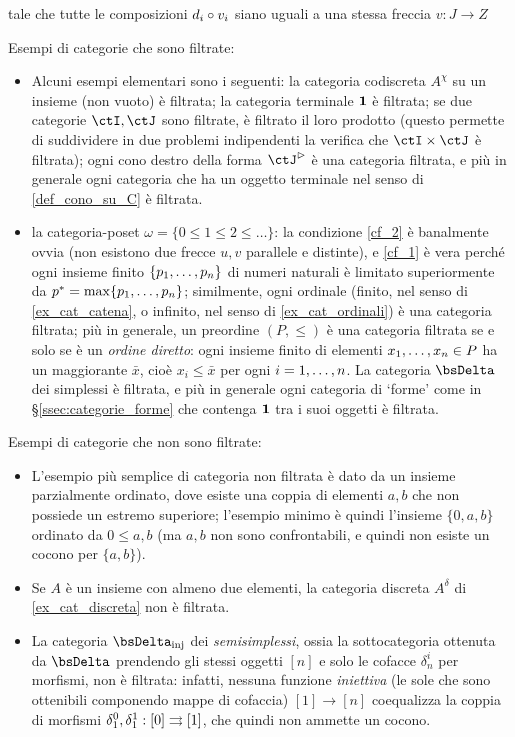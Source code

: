 tale che tutte le composizioni \(d_i\circ v_i\) siano uguali a una stessa freccia \(v : J\to Z\)
\begin{examples}\label{contro_esempi_filt}
	Esempi di categorie che sono filtrate:
	\begin{itemize}
		\item Alcuni esempi elementari sono i seguenti: la categoria codiscreta \(A^\chi\) su un insieme (non vuoto) è filtrata; la categoria terminale \(\mathbf{1}\) è filtrata; se due categorie \(\ctI,\ctJ\) sono filtrate, è filtrato il loro prodotto (questo permette di suddividere in due problemi indipendenti la verifica che \(\ctI\times\ctJ\) è filtrata); ogni cono destro della forma \(\ctJ^\rhd\) è una categoria filtrata, e più in generale ogni categoria che ha un oggetto terminale nel senso di \ref{def_cono_su_C} è filtrata.
		\item la categoria-poset \(\omega=\{0\le 1\le 2\le\dots\}\): la condizione \ref{cf_2} è banalmente ovvia (non esistono due frecce \(u,v\) parallele e distinte), e \ref{cf_1} è vera perché ogni insieme finito \(\{\tup pn,\}\) di numeri naturali è limitato superiormente da \(p^*=\max\{\tup pn,\}\); similmente, ogni ordinale (finito, nel senso di \ref{ex_cat_catena}, o infinito, nel senso di \ref{ex_cat_ordinali}) è una categoria filtrata; più in generale, un preordine \((P,\le)\) è una categoria filtrata se e solo se è un \emph{ordine diretto}: ogni insieme finito di elementi \(\tup xn, \in P\) ha un maggiorante \(\bar x\), cioè \(x_i\le \bar x\) per ogni \(i=\iter n\). La categoria \(\bsDelta\) dei simplessi è filtrata, e più in generale ogni categoria di `forme' come in §\ref{ssec:categorie_forme} che contenga \(\mathbf{1}\) tra i suoi oggetti è filtrata.
	\end{itemize}
	Esempi di categorie che non sono filtrate:
	\begin{itemize}
		\item L'esempio più semplice di categoria non filtrata è dato da un insieme parzialmente ordinato, dove esiste una coppia di elementi \(a,b\) che non possiede un estremo superiore; l'esempio minimo è quindi l'insieme \(\{0,a,b\}\) ordinato da \(0\le a,b\) (ma \(a,b\) non sono confrontabili, e quindi non esiste un cocono per \(\{a,b\}\)).
		\item Se \(A\) è un insieme con almeno due elementi, la categoria discreta \(A^\delta\) di \ref{ex_cat_discreta} non è filtrata.
		\item La categoria \(\bsDelta_\text{inj}\) dei \emph{semisimplessi}, ossia la sottocategoria ottenuta da \(\bsDelta\) prendendo gli stessi oggetti \([n]\) e solo le cofacce \(\delta_n^i\) per morfismi, non è filtrata: infatti, nessuna funzione \emph{iniettiva} (le sole che sono ottenibili componendo mappe di cofaccia) \([1] \to [n]\) coequalizza la coppia di morfismi \(\delta_1^0,\delta_1^1 : [0]\rightrightarrows [1]\), che quindi non ammette un cocono.
	\end{itemize}
\end{examples}
